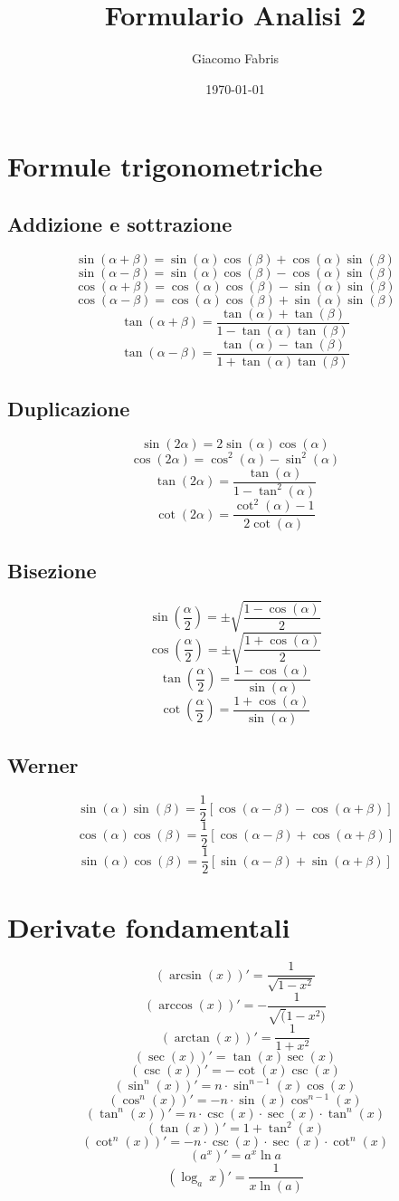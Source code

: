 \documentclass[a4paper,portrait,columns=3,5pt]{cheatsheet}
\title{Formulario Analisi 2}
\author{Giacomo Fabris}
\date{\today}
\begin{document}
\maketitle

\section{Formule trigonometriche}
\subsection{Addizione e sottrazione}
$$\sin (\alpha + \beta) = \sin(\alpha) \cos(\beta) + \cos(\alpha)\sin(\beta)$$
$$\sin(\alpha - \beta) = \sin(\alpha) \cos(\beta) - \cos(\alpha)\sin(\beta)$$
$$\cos(\alpha + \beta) = \cos(\alpha) \cos(\beta) - \sin(\alpha) \sin(\beta)$$
$$\cos(\alpha - \beta) = \cos(\alpha) \cos(\beta) + \sin(\alpha) \sin(\beta)$$
$$\tan(\alpha + \beta) = \frac{\tan(\alpha) + \tan(\beta)}{1 - \tan(\alpha)\tan(\beta)}$$
$$\tan(\alpha - \beta) = \frac{\tan(\alpha) - \tan(\beta)}{1 + \tan(\alpha)\tan(\beta)}$$
\subsection{Duplicazione}
$$\sin(2\alpha) = 2\sin(\alpha)\cos(\alpha)$$
$$\cos(2\alpha) = \cos^2 (\alpha) - \sin^2 (\alpha)$$
$$\tan(2\alpha) = \frac{\tan(\alpha)}{1 - \tan^2(\alpha)}$$
$$\cot(2\alpha) = \frac{\cot^2(\alpha) - 1}{2\cot(\alpha)}$$
\subsection{Bisezione}
$$\sin\left(\frac{\alpha}{2}\right) = \pm \sqrt{\frac{1 - \cos(\alpha)}{2}}$$
$$\cos\left(\frac{\alpha}{2}\right) = \pm \sqrt{\frac{1 + \cos(\alpha)}{2}}$$
$$\tan\left(\frac{\alpha}{2}\right) = {\frac{1 - \cos(\alpha)}{\sin(\alpha)}}$$
$$\cot\left(\frac{\alpha}{2}\right) = {\frac{1 + \cos(\alpha)}{\sin(\alpha)}}$$
\subsection{Werner}
$$\sin(\alpha)\sin(\beta) = \frac{1}{2} \left[\cos(\alpha - \beta) - \cos(\alpha + \beta)\right]$$
$$\cos(\alpha)\cos(\beta) = \frac{1}{2} \left[\cos(\alpha - \beta) + \cos(\alpha + \beta)\right]$$
$$\sin(\alpha)\cos(\beta) = \frac{1}{2} \left[\sin(\alpha - \beta) + \sin(\alpha + \beta)\right]$$

\section{Derivate fondamentali}
$$ (\arcsin(x))' = \frac{1}{\sqrt{1 - x^2}}$$
$$ (\arccos(x))' = - \frac{1}{\sqrt(1 - x^2)}$$
$$ (\arctan(x))' = \frac{1}{1 + x^2}$$
$$ (\sec(x))' = \tan(x)\sec(x)$$
$$ (\csc(x))' = -\cot(x)\csc(x)$$
$$ (\sin^n(x))' = n\cdot \sin^{n-1}(x)\cos(x)$$
$$ (\cos^n(x))' = -n\cdot \sin(x)\cos^{n-1}(x)$$
$$ (\tan^n(x))' = n \cdot \csc(x) \cdot \sec(x) \cdot \tan^n (x)$$
$$ (\tan(x))' = 1 + \tan^2(x) $$
$$ (\cot^n(x))' = - n \cdot \csc(x) \cdot \sec(x) \cdot \cot^n (x)$$
$$ (a^x)' = a^x \ln a$$
$$ (\log_a~x )' = \frac{1}{x\ln(a)}$$
\end{document}
